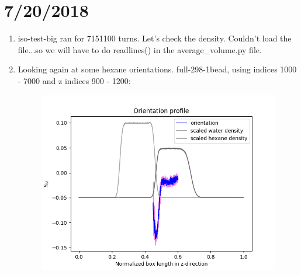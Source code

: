 \documentclass[12pt,reqno]{amsart}
\numberwithin{equation}{section}
\begin{document}
\section{7/20/2018}
\begin{enumerate}
\item iso-test-big ran for 7151100 turns.  Let's check the density.  Couldn't load the file...so we will have to do readlines() in the average\_volume.py file.  
\item Looking again at some hexane orientations.  full-298-1bead, using indices 1000 - 7000 and z indices 900 - 1200:
\begin{figure}[H]
\centering
\includegraphics[scale=0.6]{full-298-1bead-interfacial-hexane-orientation}
\end{figure}


\end{enumerate}
\end{document}
